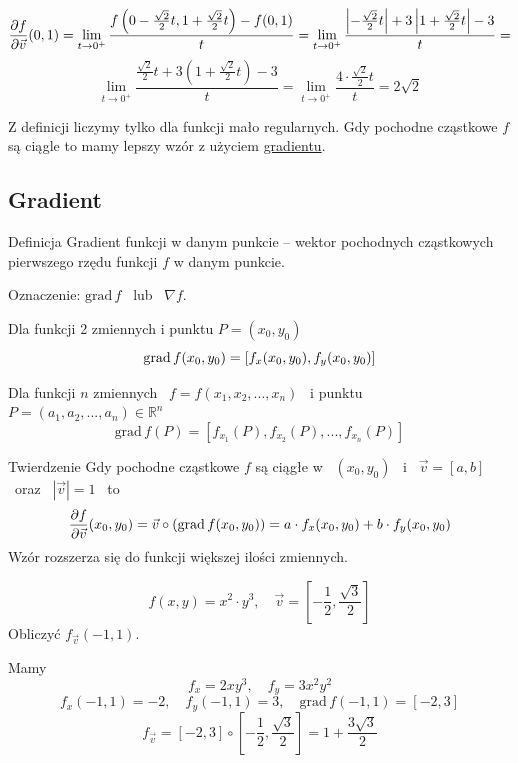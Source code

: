 \begin{przyklad}
    \[ \frac{\partial f}{\partial \vec{v}} (0,1) = \lim_{t \to 0^+} \frac{f \left( 0 - \frac{\sqrt{2}}{2}t, 1 + \frac{\sqrt{2}}{2}t \right) - f(0,1)}{t}
    = \lim_{t \to 0^+} \frac{ \left| -\frac{\sqrt{2}}{2}t \right| + 3 \left| 1 + \frac{\sqrt{2}}{2}t \right| - 3 }{t} = \]
    \[ \lim_{t \to 0^+} \frac{ \frac{\sqrt{2}}{2}t + 3 \left( 1 + \frac{\sqrt{2}}{2}t \right) - 3 }{t} = \lim_{t \to 0^+} \frac{4 \cdot \frac{\sqrt{2}}{2}t}{t} = 2 \sqrt{2} \]
\end{przyklad}

Z definicji liczymy tylko dla funkcji mało regularnych. Gdy pochodne cząstkowe $f$ są ciągle to mamy lepszy wzór z użyciem \underline{gradientu}.

\subsection*{Gradient}

\begin{tw}{Definicja}
    Gradient funkcji w danym punkcie -- wektor pochodnych cząstkowych pierwszego rzędu funkcji $f$ w danym punkcie.

    Oznaczenie: $ \text{grad}\, f$ \ lub \ $ \nabla f $.

    Dla funkcji 2 zmiennych i punktu $ P = (x_0, y_0) $
    \[ \text{grad}\, f(x_0, y_0) = [f_x(x_0, y_0), f_y(x_0, y_0)] \]

    Dla funkcji $n$ zmiennych \ $ f = f(x_1, x_2, ..., x_n) $ \ i punktu \ $ P = (a_1, a_2, ..., a_n) \in \mathbb{R}^n $
    \[ \text{grad} \, f(P) = [f_{x_1}(P), f_{x_2}(P), ..., f_{x_n}(P)] \]
\end{tw}

\begin{tw}{Twierdzenie}
    Gdy pochodne cząstkowe $f$ są ciągłe w \ $ (x_0, y_0) $ \ i \ $ \vec{v} = [a,b] $ \ oraz \ $ |\vec{v}| = 1 $ \ to
    \[ \frac{\partial f}{\partial \vec{v}} (x_0, y_0) = \vec{v} \circ (\text{grad} \, f(x_0, y_0)) = a \cdot f_x(x_0, y_0) + b \cdot f_y(x_0, y_0) \]
    Wzór rozszerza się do funkcji większej ilości zmiennych.    
\end{tw}

\begin{przyklad}
    \[ f(x,y) = x^2 \cdot y^3, \quad \vec{v} =\left[ -\frac{1}{2}, \frac{\sqrt{3}}{2} \right] \]
    Obliczyć $ f_{\vec{v}} (-1, 1) $. \bigskip

    Mamy
    \[ f_x = 2xy^3, \quad f_y = 3x^2 y^2 \]
    \[ f_x(-1, 1) = -2, \quad f_y(-1, 1) = 3, \quad \text{grad}\, f(-1, 1) = [-2, 3] \]
    \[ f_{\vec{v}} = [-2, 3] \circ \left[ -\frac{1}{2}, \frac{\sqrt{3}}{2} \right] = 1 + \frac{3 \sqrt{3}}{2} \]
\end{przyklad}

